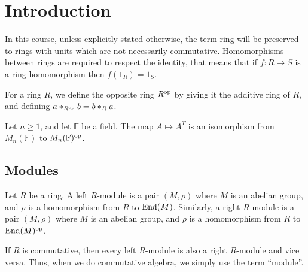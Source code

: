 \documentclass[11pt,a4paper]{article}
\begin{document}
\maketitle


\newpage
\tableofcontents
\newpage

\section{Introduction}

\begin{remark}
  In this course, unless explicitly stated otherwise, the term
  ring will be preserved to rings with units which are not necessarily
  commutative.
  Homomorphisms between rings are required to respect the identity,
  that means that if $f \colon R \to S$ is a ring homomorphism
  then $f(1_R) = 1_S$.
\end{remark}

\begin{definition}
  For a ring $R$, we define the opposite ring $R^{\operatorname{op}}$ by giving
  it the additive ring of $R$, and defining $a *_{R^{\operatorname{op}}} b = b *_R a$.
\end{definition}

\begin{example}
  Let $n \geq 1$, and let $\mathbb F$ be a field.
  The map $A \mapsto A^T$ is an isomorphism from $M_n(\mathbb F)$ to $M_n(\mathbb F)^{\operatorname{op}}$.
\end{example}

\subsection{Modules}

\begin{definition}[Module]
  Let $R$ be a ring.
  A left $R$-module is a pair $(M,\rho)$ where $M$ is an abelian group,
  and $\rho$ is a homomorphism from $R$ to $\operatorname{End}(M)$.
  Similarly, a right $R$-module is a pair $(M,\rho)$ where $M$ is an abelian
  group, and $\rho$ is a homomorphism from $R$ to $\operatorname{End}(M)^{\operatorname{op}}$.
\end{definition}

\begin{remark}
  If $R$ is commutative, then every left $R$-module is also a right $R$-module
  and vice versa.
  Thus, when we do commutative algebra, we simply use the term ``module''.
\end{remark}
\end{document}
